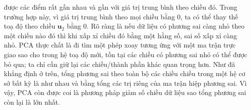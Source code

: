 được các điểm rất gần nhau và gần với giá trị trung bình theo chiều đó. Trong
trường hợp này, vì giá trị trung bình theo mọi chiều bằng 0, ta có thể thay thế
toạ độ theo chiều $\mathbf{u}_2$ bằng 0. Rõ ràng là nếu dữ liệu có phương sai
càng nhỏ theo một chiều nào đó thì khi xấp xỉ chiều đó bằng một hằng số, sai số
xấp xỉ càng nhỏ. PCA thực chất là đi tìm một phép xoay tương ứng với một ma trận
trực giao sao cho trong hệ toạ độ mới, tồn tại các chiều có phương sai nhỏ
có thể được bỏ qua; ta chỉ cần giữ lại các chiều/thành phần khác quan trọng hơn. Như
đã khẳng định ở trên, tổng phương sai theo toàn bộ các chiều chiều trong một hệ cơ sở bất kỳ là
như nhau và bằng tổng các trị riêng của ma trận hiệp phương sai. Vì vậy, PCA còn
được coi là phương pháp giảm số chiều dữ liệu sao tổng phương sai còn lại là lớn
nhất.








